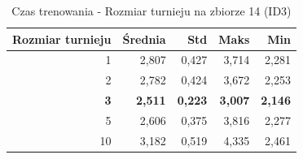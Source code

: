 \begin{table}[htbp]
\centering
\small
\setlength{\tabcolsep}{6pt}
\renewcommand{\arraystretch}{1.2}
\caption{Czas trenowania - Rozmiar turnieju na zbiorze 14 (ID3)}
\label{tab:ID3_tournament_size_14_time}
\begin{tabular}{r|r|r|r|r}
\toprule
Rozmiar turnieju & Średnia & Std & Maks & Min \\
\hline
1 & 2,807 & 0,427 & 3,714 & 2,281 \\
2 & 2,782 & 0,424 & 3,672 & 2,253 \\
\textbf{3} & \textbf{2,511} & \textbf{0,223} & \textbf{3,007} & \textbf{2,146} \\
5 & 2,606 & 0,375 & 3,816 & 2,277 \\
10 & 3,182 & 0,519 & 4,335 & 2,461 \\
\bottomrule
\end{tabular}
\end{table}